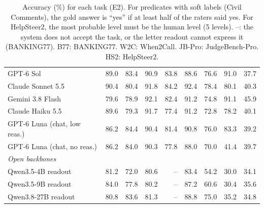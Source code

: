 \begin{table}[t]
\begin{tabular}{lrrrrrrrr}
GPT-6 Sol & 89.0 & 83.4 & 90.9 & 83.8 & 88.6 & 76.6 & 91.0 & 37.7 \\
Claude Sonnet 5.5 & 90.4 & 80.4 & 91.8 & 84.2 & 92.4 & 78.4 & 80.1 & 40.3 \\
Gemini 3.8 Flash & 79.6 & 78.9 & 92.1 & 82.4 & 91.2 & 74.8 & 91.1 & 45.9 \\
Claude Haiku 5.5 & 89.6 & 79.3 & 91.7 & 77.4 & 91.2 & 72.8 & 78.2 & 40.1 \\
GPT-6 Luna (chat, low reas.) & 86.2 & 84.4 & 90.4 & 81.4 & 90.8 & 76.0 & 83.3 & 39.2 \\
GPT-6 Luna (chat, no reas.) & 86.2 & 84.0 & 90.3 & 77.8 & 88.0 & 70.0 & 41.4 & 39.7 \\
\midrule
\multicolumn{9}{l}{\textit{Open backbones}} \\
Qwen3.5-4B readout & 81.2 & 72.0 & 80.6 & -- & 83.4 & 54.2 & 30.0 & 34.1 \\
Qwen3.5-9B readout & 84.0 & 77.8 & 80.2 & -- & 87.2 & 60.6 & 30.4 & 35.6 \\
Qwen3.8-27B readout & 80.8 & 83.6 & 81.3 & -- & 88.8 & 75.0 & 35.2 & 34.8 \\
\bottomrule
\end{tabular}
\caption{Accuracy (\%) for each task (E2). For predicates with soft labels (Civil Comments), the gold answer is ``yes'' if at least half of the raters said yes. For HelpSteer2, the most probable level must be the human level (5 levels). --: the system does not accept the task, or the letter readout cannot express it (BANKING77). B77: BANKING77. W2C: When2Call. JB-Pro: JudgeBench-Pro. HS2: HelpSteer2.}
\label{tab:app-acc}
\end{table}
